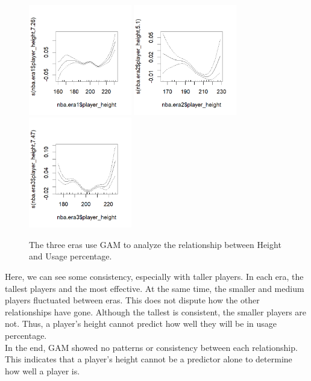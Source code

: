 \documentclass[11pt,letterpaper]{amsart}
\begin{document}
\begin{figure}[H] 
\includegraphics[width=0.4\textwidth]{Era1us}\hspace{1cm}
\includegraphics[width=0.4\textwidth]{Era2us}\hspace{1cm}
\includegraphics[width=0.4\textwidth]{Era3us}\hspace{1cm}
\caption{The three eras use GAM to analyze the relationship between Height and Usage percentage. \label{fig5}}
\end{figure} \leavevmode

\indent Here, we can see some consistency, especially with taller players. In each era, the tallest players and the most effective. At the same time, the smaller and medium players fluctuated between eras. This does not dispute how the other relationships have gone. Although the tallest is consistent, the smaller players are not. Thus, a player’s height cannot predict how well they will be in usage percentage.\\
\indent In the end, GAM showed no patterns or consistency between each relationship. This indicates that a player’s height cannot be a predictor alone to determine how well a player is.\\\\
\end{document}
